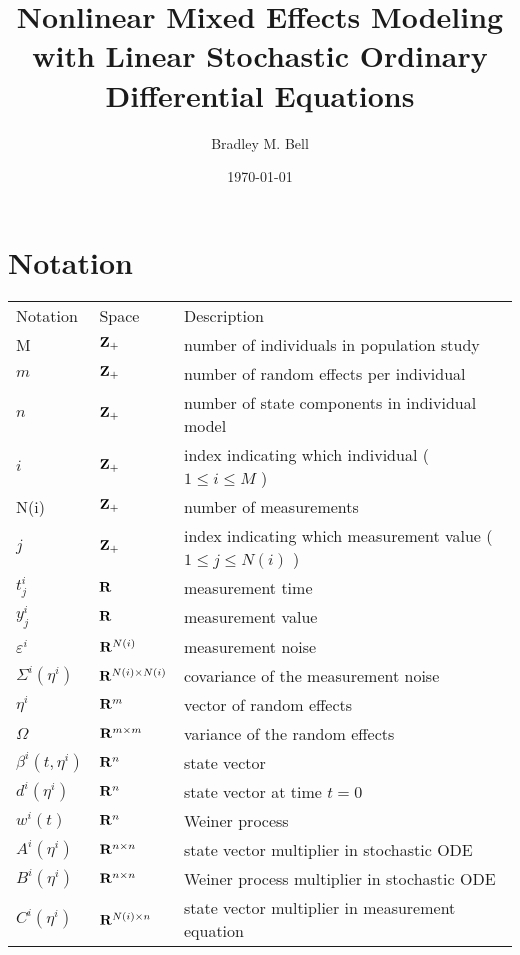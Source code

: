 \documentclass{article}
\newcommand{\BR}{{\bf R}}
\newcommand{\BZ}{{\bf Z}}
\begin{document}
\Large

\title{
	Nonlinear Mixed Effects Modeling with 
	Linear Stochastic Ordinary Differential Equations
}
\author{Bradley M. Bell}
\date{\today}
\maketitle


\section{Notation}
\begin{tabular}{lll}
Notation
	& Space
	& Description 
\\
M       & \( \BZ_+ \)
	& number of individuals in population study
\\
\( m \)
	& \( \BZ_+ \)
	& number of random effects per individual
\\
\( n \) 
	& \( \BZ_+ \)
	& number of state components in individual model 
\\
\( i \)
	& \( \BZ_+ \)
	& index indicating which individual  ( \( 1 \leq i \leq M \) )
\\
N(i)    & \( \BZ_+ \)
	& number of measurements 
\\
\( j \)
	& \( \BZ_+ \)
	& index indicating which measurement value  ( \( 1 \leq j \leq N(i) \) )
\\
\( t_j^i \)
	& \( \BR \)
	& measurement time
\\
\( y_j^i \)
	& \( \BR \)
	& measurement value
\\
\( \varepsilon^i \)
	& \( \BR^{N(i)} \)
	& measurement noise
\\
\( \Sigma^i ( \eta^i ) \)
	& \( \BR^{N(i) \times N(i)} \)
	& covariance of the measurement noise
\\
\( \eta^i \)
	& \( \BR^m \)
	& vector of random effects 
\\
\( \Omega \)
	& \( \BR^{m \times m} \)
	& variance of the random effects
\\
\( \beta^i (t , \eta^i ) \)
	& \( \BR^n \) 
	& state vector 
\\
\( d^i ( \eta^i ) \)
	& \( \BR^n \)
	& state vector at time \( t = 0 \)
\\
\( w^i (t) \)
	& \( \BR^n \) 
	& Weiner process 
\\
\( A^i  (  \eta^i )  \)
	& \( \BR^{n \times n} \)
	& state vector multiplier in stochastic ODE  
\\
\( B^i (  \eta^i ) \)
	& \( \BR^{n \times n} \)
	& Weiner process multiplier in stochastic ODE  
\\
\( C^i (  \eta^i ) \)
	& \( \BR^{N(i) \times n} \)
	& state vector multiplier in measurement equation
\end{tabular}
\end{document}
